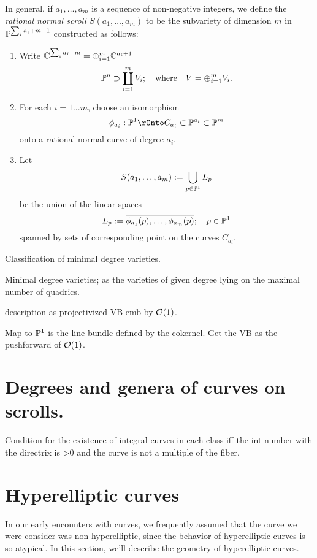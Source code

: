 In general, if $a_1,\dots, a_m$ is a sequence of non-negative integers, we define the  \emph{rational normal scroll $S(a_1,\dots, a_m)$} 
to be the subvariety of dimension $m$ in $\PP^{\sum_i a_i+m-1}$ constructed as follows:

\begin{enumerate}
 \item Write $\CC^{\sum_i a_i+m} = \oplus_{i=1}^m\CC^{a_i+1}$ 
$$
\PP^n \supset \coprod_{i= 1}^m V_i; \quad \hbox{where} \quad V = \oplus_{i= 1}^m V_i.
$$
\item For each $i = 1...m$, choose an isomorphism 
$$
\phi_{a_i}:\PP^1\rOnto C_{a_i}\subset \PP^{a_i}\subset \PP^m
$$ 
onto a rational normal curve of degree $a_i$.
\item Let 
$$
S(a_1,\dots,a_m) := \bigcup_{p\in \PP^1} L_p
$$
 be the union of the linear spaces 
$$
L_p := \overline{\phi_{a_1}(p), \dots, \phi_{a_m}(p)}; \quad p\in \PP^1
$$
spanned by sets of corresponding point on the curves $C_{a_i}$.
\end{enumerate}


\begin{fact} 
 Classification of minimal degree varieties.
 
 Minimal degree varieties; as the varieties of given degree lying on the maximal number of quadrics.

\end{fact}
 
description as projectivized VB emb by $\cO(1)$.

  Map to $\PP^1$ is the line bundle defined by the cokernel. Get the VB as the pushforward of $\cO(1)$.
  
  
\section{Degrees and genera of curves on scrolls.} Condition for the existence of integral curves in each class iff the int number with the directrix is >0 and the curve is not a multiple of the fiber. 


\section{Hyperelliptic curves}

In our early encounters with curves, we frequently assumed that the curve we were consider was non-hyperelliptic, since the behavior of hyperelliptic curves is so atypical. In this section, we'll describe the geometry of hyperelliptic curves.

